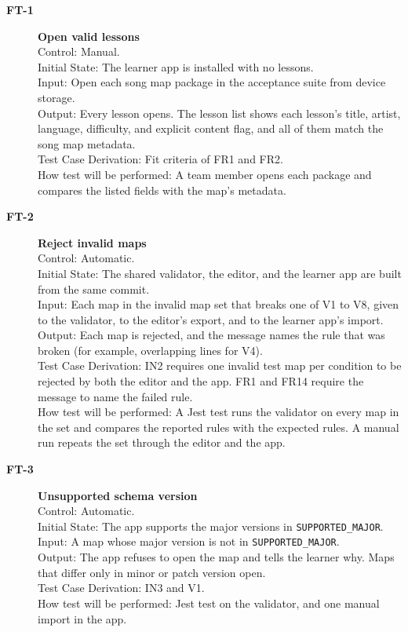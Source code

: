 \documentclass[12pt, titlepage]{article}
\newcommand{\tid}[1]{\hypertarget{test:#1}{\textbf{#1}}}
\newcommand{\cn}[1]{\texttt{#1}}
\begin{document}
\begin{description}

\item[\tid{FT-1}] \textbf{Open valid lessons}\\
Control: Manual.\\
Initial State: The learner app is installed with no lessons.\\
Input: Open each song map package in the acceptance suite from device
storage.\\
Output: Every lesson opens. The lesson list shows each lesson's title, artist,
language, difficulty, and explicit content flag, and all of them match the song
map metadata.\\
Test Case Derivation: Fit criteria of FR1 and FR2.\\
How test will be performed: A team member opens each package and compares the
listed fields with the map's metadata.

\item[\tid{FT-2}] \textbf{Reject invalid maps}\\
Control: Automatic.\\
Initial State: The shared validator, the editor, and the learner app are built
from the same commit.\\
Input: Each map in the invalid map set that breaks one of V1 to V8, given to the
validator, to the editor's export, and to the learner app's import.\\
Output: Each map is rejected, and the message names the rule that was broken
(for example, overlapping lines for V4).\\
Test Case Derivation: IN2 requires one invalid test map per condition to be
rejected by both the editor and the app. FR1 and FR14 require the message to name
the failed rule.\\
How test will be performed: A Jest test runs the validator on every map in the
set and compares the reported rules with the expected rules. A manual run
repeats the set through the editor and the app.

\item[\tid{FT-3}] \textbf{Unsupported schema version}\\
Control: Automatic.\\
Initial State: The app supports the major versions in \cn{SUPPORTED\_MAJOR}.\\
Input: A map whose major version is not in \cn{SUPPORTED\_MAJOR}.\\
Output: The app refuses to open the map and tells the learner why. Maps that
differ only in minor or patch version open.\\
Test Case Derivation: IN3 and V1.\\
How test will be performed: Jest test on the validator, and one manual import in
the app.


\end{description}
\end{document}
